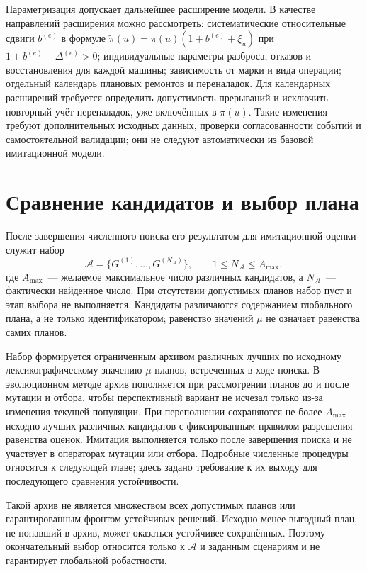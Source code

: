 Параметризация допускает дальнейшее расширение модели. В качестве направлений расширения можно рассмотреть: систематические относительные сдвиги $b^{(e)}$ в формуле $\widetilde{\pi}(u)=\pi(u)(1+b^{(e)}+\xi_u)$ при $1+b^{(e)}-\Delta^{(e)}>0$; индивидуальные параметры разброса, отказов и восстановления для каждой машины; зависимость от марки и вида операции; отдельный календарь плановых ремонтов и переналадок. Для календарных расширений требуется определить допустимость прерываний и исключить повторный учёт переналадок, уже включённых в $\pi(u)$. Такие изменения требуют дополнительных исходных данных, проверки согласованности событий и самостоятельной валидации; они не следуют автоматически из базовой имитационной модели.

\section{Сравнение кандидатов и выбор плана}\label{sec:model/selection}
После завершения численного поиска его результатом для имитационной оценки служит набор
\[
\mathcal{A}=\{G^{(1)},\ldots,G^{(N_{\mathcal A})}\},\qquad 1\leq N_{\mathcal A}\leq A_{\max},
\]
где $A_{\max}$~--- желаемое максимальное число различных кандидатов, а $N_{\mathcal A}$~--- фактически найденное число. При отсутствии допустимых планов набор пуст и этап выбора не выполняется. Кандидаты различаются содержанием глобального плана, а не только идентификатором; равенство значений $\mu$ не означает равенства самих планов.

Набор формируется ограниченным архивом различных лучших по исходному лексикографическому значению $\mu$ планов, встреченных в ходе поиска. В эволюционном методе архив пополняется при рассмотрении планов до и после мутации и отбора, чтобы перспективный вариант не исчезал только из-за изменения текущей популяции. При переполнении сохраняются не более $A_{\max}$ исходно лучших различных кандидатов с фиксированным правилом разрешения равенства оценок. Имитация выполняется только после завершения поиска и не участвует в операторах мутации или отбора. Подробные численные процедуры относятся к следующей главе; здесь задано требование к их выходу для последующего сравнения устойчивости.

Такой архив не является множеством всех допустимых планов или гарантированным фронтом устойчивых решений. Исходно менее выгодный план, не попавший в архив, может оказаться устойчивее сохранённых. Поэтому окончательный выбор относится только к $\mathcal{A}$ и заданным сценариям и не гарантирует глобальной робастности.

